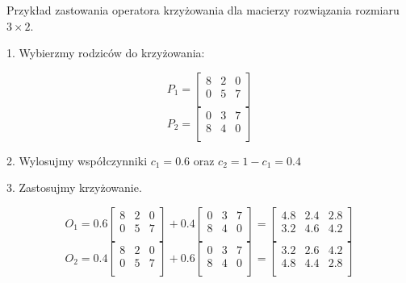 \begin{example}
    Przykład zastowania operatora krzyżowania dla macierzy rozwiązania rozmiaru $3 \times 2$.

    1. Wybierzmy rodziców do krzyżowania:

    $$
        P_1
        =
        \begin{bmatrix}
            8 & 2 & 0 \\
            0 & 5 & 7 \\
        \end{bmatrix}
    $$
    $$
        P_2
        =
        \begin{bmatrix}
            0 & 3 & 7 \\
            8 & 4 & 0 \\
        \end{bmatrix}
    $$

    2. Wylosujmy współczynniki $c_1 = 0.6$ oraz $c_2 = 1 - c_1 = 0.4$

    3. Zastosujmy krzyżowanie.

    $$
        O_1
        =
        0.6
        \begin{bmatrix}
            8 & 2 & 0 \\
            0 & 5 & 7 \\
        \end{bmatrix}
        +
        0.4
        \begin{bmatrix}
            0 & 3 & 7 \\
            8 & 4 & 0 \\
        \end{bmatrix}
        =
        \begin{bmatrix}
            4.8 & 2.4 & 2.8 \\
            3.2 & 4.6 & 4.2 \\
        \end{bmatrix}
    $$
    $$
        O_2
        =
        0.4
        \begin{bmatrix}
            8 & 2 & 0 \\
            0 & 5 & 7 \\
        \end{bmatrix}
        +
        0.6
        \begin{bmatrix}
            0 & 3 & 7 \\
            8 & 4 & 0 \\
        \end{bmatrix}
        =
        \begin{bmatrix}
            3.2 & 2.6 & 4.2 \\
            4.8 & 4.4 & 2.8 \\
        \end{bmatrix}
    $$

\end{example}


